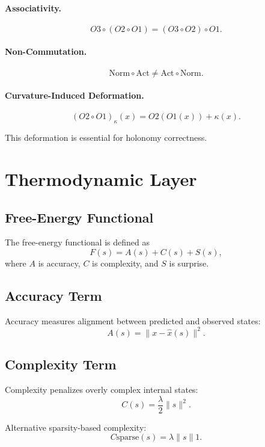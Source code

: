 \paragraph{Associativity.}
\[
O3 \circ (O2 \circ O1) = (O3 \circ O2) \circ O1.
\]

\paragraph{Non-Commutation.}
\[
\mathrm{Norm} \circ \mathrm{Act} \ne \mathrm{Act} \circ \mathrm{Norm}.
\]

\paragraph{Curvature-Induced Deformation.}
\[
(O2 \circ O1)_{\kappa}(x)
= O2(O1(x)) + \kappa(x).
\]

This deformation is essential for holonomy correctness.

\section{Thermodynamic Layer}

\subsection{Free-Energy Functional}

The free-energy functional is defined as
\[
F(s) = A(s) + C(s) + S(s),
\]
where $A$ is accuracy, $C$ is complexity, and $S$ is surprise.

\subsection{Accuracy Term}

Accuracy measures alignment between predicted and observed states:
\[
A(s) = \|x - \hat{x}(s)\|^2.
\]

\subsection{Complexity Term}

Complexity penalizes overly complex internal states:
\[
C(s) = \frac{\lambda}{2} \|s\|^2.
\]

Alternative sparsity-based complexity:
\[
C{\text{sparse}}(s) = \lambda \|s\|1.
\]

